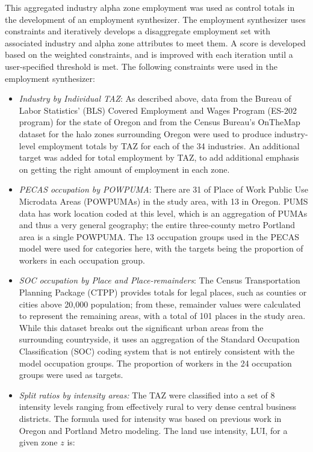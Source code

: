This aggregated industry alpha zone employment was used as control totals in the development of an employment synthesizer. The employment synthesizer uses constraints and iteratively develops a disaggregate employment set with associated industry and alpha zone attributes to meet them. A score is developed based on the weighted constraints, and is improved with each iteration until a user-specified threshold is met. The following constraints were used in the employment synthesizer: 
\begin{itemize}
\item \textit{Industry by Individual TAZ}: As described above, data from the Bureau of Labor Statistics' (BLS) Covered Employment and Wages Program (ES-202 program) for the state of Oregon and from the Census Bureau's OnTheMap dataset for the halo zones surrounding Oregon were used to produce industry-level employment totals by TAZ for each of the 34 industries. An additional target was added for total employment by TAZ, to add additional emphasis on getting the right amount of employment in each zone. 
\item \textit{PECAS occupation by POWPUMA}: There are 31 of Place of Work Public Use Microdata Areas (POWPUMAs) in the study area, with 13 in Oregon. PUMS data has work location coded at this level, which is an aggregation of PUMAs and thus a very general geography; the entire three-county metro Portland area is a single POWPUMA. The 13 occupation groups used in the PECAS model were used for categories here, with the targets being the proportion of workers in each occupation group.
\item \textit{SOC occupation by Place and Place-remainders}: 
The Census Transportation Planning Package (CTPP) provides totals for legal places, such as counties or cities above 20,000 population; from these, remainder values were calculated to represent the remaining areas, with a total of 101 places in the study area. While this dataset breaks out the significant urban areas from the surrounding countryside, it uses an aggregation of the Standard Occupation Classification (SOC) coding system that is not entirely consistent with the model occupation groups. The proportion of workers in the 24 occupation groups were used as targets.
\item \textit{Split ratios by intensity areas:} The TAZ were classified into a set of 8 intensity levels ranging from effectively rural to very 
dense central business districts. The formula used for intensity was based on previous work in 
Oregon and Portland Metro modeling. The land use intensity, LUI, for a given zone $z$ is:

\end{itemize}
